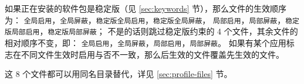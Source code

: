 如果正在安装的软件包是稳定版（见 \ref{sec:keywords} 节），那么文件的生效顺序为：
\texttt{全局启用}，\texttt{全局屏蔽}，\texttt{稳定版全局启用}，\texttt{稳定版全局屏蔽}，
\texttt{局部启用}，\texttt{局部屏蔽}，\texttt{稳定版局部启用}，\texttt{稳定版局部屏蔽}；
不是的话则跳过稳定版约束的 4 个文件，其余文件的相对顺序不变，即：
\texttt{全局启用}，\texttt{全局屏蔽}，\texttt{局部启用}，\texttt{局部屏蔽}。
如果有某个应用标志在不同文件生效时启用与否不一致，那么后生效的文件覆盖先生效的文件。

这 8 个文件都可以用同名目录替代，详见 \ref{sec:profile-files} 节。




